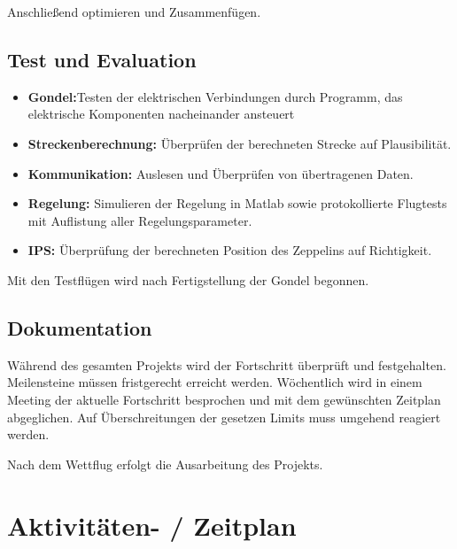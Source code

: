 \documentclass[lang=ngerman,inputenc=utf8,fontsize=10pt]{ldvarticle}
\begin{document}
Anschließend optimieren und Zusammenfügen.

\subsection*{Test und Evaluation}
\begin{itemize}
\item \textbf{Gondel:}Testen der elektrischen Verbindungen durch Programm, das elektrische Komponenten nacheinander ansteuert 
\item \textbf{Streckenberechnung:} Überprüfen der berechneten Strecke auf Plausibilität.
\item \textbf{Kommunikation:} Auslesen und Überprüfen von übertragenen Daten.
\item \textbf{Regelung:} Simulieren der Regelung in Matlab sowie protokollierte Flugtests mit Auflistung aller Regelungsparameter. 
\item \textbf{IPS:} Überprüfung der berechneten Position des Zeppelins auf Richtigkeit.   
\end{itemize}
Mit den Testflügen wird nach Fertigstellung der Gondel begonnen. 


\subsection*{Dokumentation}
Während des gesamten Projekts wird der Fortschritt überprüft und festgehalten.
Meilensteine müssen fristgerecht erreicht werden. Wöchentlich wird in einem Meeting der aktuelle Fortschritt besprochen und mit dem gewünschten Zeitplan abgeglichen.
Auf Überschreitungen der gesetzen Limits muss umgehend reagiert werden.


Nach dem Wettflug erfolgt die Ausarbeitung des Projekts.


\section{Aktivitäten- / Zeitplan}
\end{document}
